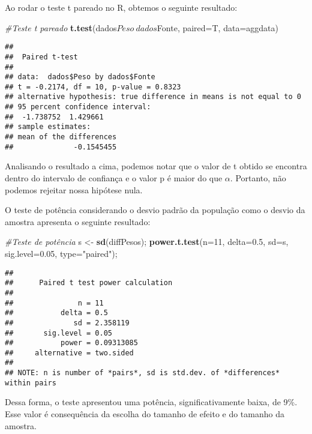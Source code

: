 \documentclass[]{article}
\newenvironment{Shaded}{\begin{snugshade}}{\end{snugshade}}
\newcommand{\KeywordTok}[1]{\textcolor[rgb]{0.13,0.29,0.53}{\textbf{{#1}}}}
\newcommand{\DataTypeTok}[1]{\textcolor[rgb]{0.13,0.29,0.53}{{#1}}}
\newcommand{\DecValTok}[1]{\textcolor[rgb]{0.00,0.00,0.81}{{#1}}}
\newcommand{\FloatTok}[1]{\textcolor[rgb]{0.00,0.00,0.81}{{#1}}}
\newcommand{\StringTok}[1]{\textcolor[rgb]{0.31,0.60,0.02}{{#1}}}
\newcommand{\CommentTok}[1]{\textcolor[rgb]{0.56,0.35,0.01}{\textit{{#1}}}}
\newcommand{\NormalTok}[1]{{#1}}
\begin{document}
\quad Ao rodar o teste t pareado no R, obtemos o seguinte resultado:

\begin{Shaded}
\begin{Highlighting}[]
\CommentTok{#Teste t pareado}
\KeywordTok{t.test}\NormalTok{(dados$Peso~dados$Fonte, }\DataTypeTok{paired=}\NormalTok{T, }\DataTypeTok{data=}\NormalTok{aggdata)}
\end{Highlighting}
\end{Shaded}

\begin{verbatim}
## 
##  Paired t-test
## 
## data:  dados$Peso by dados$Fonte
## t = -0.2174, df = 10, p-value = 0.8323
## alternative hypothesis: true difference in means is not equal to 0
## 95 percent confidence interval:
##  -1.738752  1.429661
## sample estimates:
## mean of the differences 
##              -0.1545455
\end{verbatim}

\quad Analisando o resultado a cima, podemos notar que o valor de t
obtido se encontra dentro do intervalo de confiança e o valor p é maior
do que $\alpha$. Portanto, não podemos rejeitar nossa hipótese nula.

\quad O teste de potência considerando o desvio padrão da população como
o desvio da amostra apresenta o seguinte resultado:

\begin{Shaded}
\begin{Highlighting}[]
\CommentTok{#Teste de potência}
\NormalTok{s <-}\StringTok{ }\KeywordTok{sd}\NormalTok{(diffPesos);}
\KeywordTok{power.t.test}\NormalTok{(}\DataTypeTok{n=}\DecValTok{11}\NormalTok{,}
             \DataTypeTok{delta=}\FloatTok{0.5}\NormalTok{,}
             \DataTypeTok{sd=}\NormalTok{s,}
             \DataTypeTok{sig.level=}\FloatTok{0.05}\NormalTok{,}
             \DataTypeTok{type=}\StringTok{"paired"}\NormalTok{);}
\end{Highlighting}
\end{Shaded}

\begin{verbatim}
## 
##      Paired t test power calculation 
## 
##               n = 11
##           delta = 0.5
##              sd = 2.358119
##       sig.level = 0.05
##           power = 0.09313085
##     alternative = two.sided
## 
## NOTE: n is number of *pairs*, sd is std.dev. of *differences* within pairs
\end{verbatim}

\quad Dessa forma, o teste apresentou uma potência, significativamente
baixa, de 9\%. Esse valor é consequência da escolha do tamanho de efeito
e do tamanho da amostra.
\end{document}

